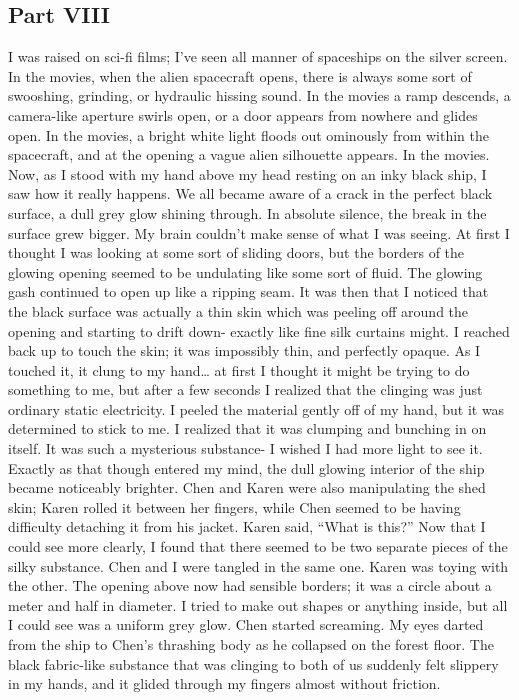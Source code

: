 \documentclass[a4paper]{article}
\begin{document}
\subsection{Part VIII}

I was raised on sci-fi films; I’ve seen all manner of spaceships on the silver screen. In the movies, when the alien spacecraft opens, there is always some sort of swooshing, grinding, or hydraulic hissing sound. In the movies a ramp descends, a camera-like aperture swirls open, or a door appears from nowhere and glides open. In the movies, a bright white light floods out ominously from within the spacecraft, and at the opening a vague alien silhouette appears. In the movies.
Now, as I stood with my hand above my head resting on an inky black ship, I saw how it really happens. We all became aware of a crack in the perfect black surface, a dull grey glow shining through. In absolute silence, the break in the surface grew bigger.
My brain couldn’t make sense of what I was seeing. At first I thought I was looking at some sort of sliding doors, but the borders of the glowing opening seemed to be undulating like some sort of fluid. The glowing gash continued to open up like a ripping seam. It was then that I noticed that the black surface was actually a thin skin which was peeling off around the opening and starting to drift down- exactly like fine silk curtains might.
I reached back up to touch the skin; it was impossibly thin, and perfectly opaque. As I touched it, it clung to my hand… at first I thought it might be trying to do something to me, but after a few seconds I realized that the clinging was just ordinary static electricity.
I peeled the material gently off of my hand, but it was determined to stick to me. I realized that it was clumping and bunching in on itself. It was such a mysterious substance- I wished I had more light to see it. Exactly as that though entered my mind, the dull glowing interior of the ship became noticeably brighter.
Chen and Karen were also manipulating the shed skin; Karen rolled it between her fingers, while Chen seemed to be having difficulty detaching it from his jacket. Karen said, “What is this?”
Now that I could see more clearly, I found that there seemed to be two separate pieces of the silky substance. Chen and I were tangled in the same one. Karen was toying with the other. The opening above now had sensible borders; it was a circle about a meter and half in diameter. I tried to make out shapes or anything inside, but all I could see was a uniform grey glow.
Chen started screaming.
My eyes darted from the ship to Chen’s thrashing body as he collapsed on the forest floor. The black fabric-like substance that was clinging to both of us suddenly felt slippery in my hands, and it glided through my fingers almost without friction.
\end{document}
